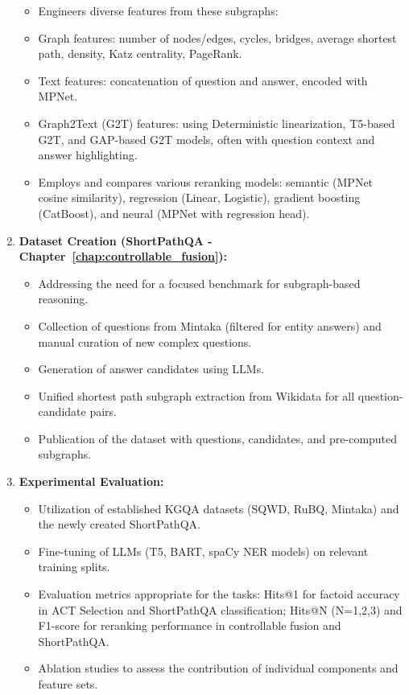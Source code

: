 \begin{enumerate}
\begin{itemize}
            \item Engineers diverse features from these subgraphs:
                \item Graph features: number of nodes/edges, cycles, bridges, average shortest path, density, Katz centrality, PageRank.
                \item Text features: concatenation of question and answer, encoded with MPNet.
                \item Graph2Text (G2T) features: using Deterministic linearization, T5-based G2T, and GAP-based G2T models, often with question context and answer highlighting.
            \item Employs and compares various reranking models: semantic (MPNet cosine similarity), regression (Linear, Logistic), gradient boosting (CatBoost), and neural (MPNet with regression head).
    \end{itemize}
    \item \textbf{Dataset Creation (ShortPathQA - Chapter~\ref{chap:controllable_fusion}):}
    \begin{itemize}
        \item Addressing the need for a focused benchmark for subgraph-based reasoning.
        \item Collection of questions from Mintaka (filtered for entity answers) and manual curation of new complex questions.
        \item Generation of answer candidates using LLMs.
        \item Unified shortest path subgraph extraction from Wikidata for all question-candidate pairs.
        \item Publication of the dataset with questions, candidates, and pre-computed subgraphs.
    \end{itemize}
    \item \textbf{Experimental Evaluation:}
    \begin{itemize}
        \item Utilization of established KGQA datasets (SQWD, RuBQ, Mintaka) and the newly created ShortPathQA.
        \item Fine-tuning of LLMs (T5, BART, spaCy NER models) on relevant training splits.
        \item Evaluation metrics appropriate for the tasks: Hits@1 for factoid accuracy in ACT Selection and ShortPathQA classification; Hits@N (N=1,2,3) and F1-score for reranking performance in controllable fusion and ShortPathQA.
        \item Ablation studies to assess the contribution of individual components and feature sets.

\end{itemize}
\end{enumerate}
